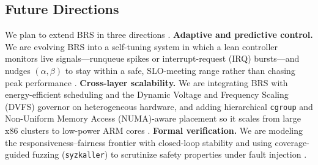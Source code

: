 \subsection{Future Directions}
\label{subsec:future}
We plan to extend BRS in three directions \cite{10306992,6919315}. \textbf{Adaptive and predictive control.} We are evolving BRS into a self-tuning system in which a lean controller monitors live signals---runqueue spikes or interrupt-request (IRQ) bursts---and nudges $(\alpha,\beta)$ to stay within a safe, SLO-meeting range rather than chasing peak performance \cite{7426385,Zhang2025Tail,6782279,8338088}. \textbf{Cross-layer scalability.} We are integrating BRS with energy-efficient scheduling and the Dynamic Voltage and Frequency Scaling (DVFS) governor on heterogeneous hardware, and adding hierarchical \texttt{cgroup} and Non-Uniform Memory Access (NUMA)-aware placement so it scales from large x86 clusters to low-power ARM cores \cite{1244943,9121657,6919315,8360522}. \textbf{Formal verification.} We are modeling the responsiveness--fairness frontier with closed-loop stability and using coverage-guided fuzzing (\texttt{syzkaller}) to scrutinize safety properties under fault injection \cite{5169938,9351534}.
